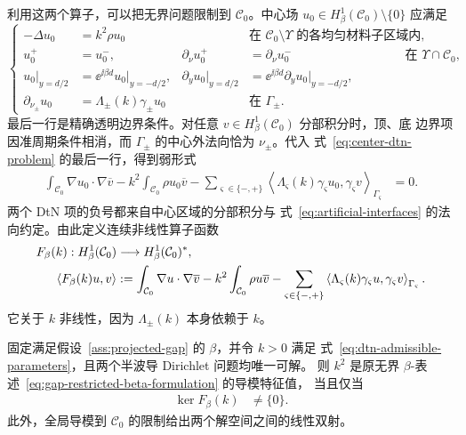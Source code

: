 利用这两个算子，可以把无界问题限制到 $\mathcal{C}_0$。中心场
$u_0\in H^1_\beta(\mathcal{C}_0)\setminus\{0\}$ 应满足
\begin{equation}
  \left\{
  \begin{aligned}
    -\Delta u_0&=k^2\rho u_0
    &&\text{在 }\mathcal{C}_0\setminus\Upsilon\text{ 的各均匀材料子区域内},\\
    u_0^+&=u_0^- ,
    &\partial_\nu u_0^+&=\partial_\nu u_0^-
    &&\text{在 }\Upsilon\cap\mathcal{C}_0,\\
    u_0|_{y=d/2}
    &=\ee^{\ii\beta d}u_0|_{y=-d/2},
    &\partial_yu_0|_{y=d/2}
    &=\ee^{\ii\beta d}\partial_yu_0|_{y=-d/2},\\
    \partial_{\nu_\pm}u_0
    &=\Lambda_\pm(k)\gamma_\pm u_0
    &&\text{在 }\Gamma_\pm.
  \end{aligned}
  \right.
  \label{eq:center-dtn-problem}
\end{equation}
最后一行是精确透明边界条件。对任意 $v\in H^1_\beta(\mathcal{C}_0)$ 分部积分时，顶、底
边界项因准周期条件相消，而 $\Gamma_\pm$ 的中心外法向恰为 $\nu_\pm$。代入
式~\eqref{eq:center-dtn-problem} 的最后一行，得到弱形式
\begin{align}
  \int_{\mathcal{C}_0}\nabla u_0\mathbin{\cdot}\nabla\overline v
  -k^2\int_{\mathcal{C}_0}\rho u_0\overline v
  -\sum_{\varsigma\in\{-,+\}}
   \left\langle
   \Lambda_\varsigma(k)\gamma_\varsigma u_0,
   \gamma_\varsigma v
   \right\rangle_{\Gamma_\varsigma}
  &=0.
  \label{eq:center-dtn-weak-form}
\end{align}
两个 DtN 项的负号都来自中心区域的分部积分与
式~\eqref{eq:artificial-interfaces} 的法向约定。由此定义连续非线性算子函数
\begin{align}
  F_\beta(k):H^1_\beta(\mathcal{C}_0)
  &\longrightarrow H^1_\beta(\mathcal{C}_0)^*,
  \notag\\
  \langle F_\beta(k)u,v\rangle
  &:=\int_{\mathcal{C}_0}\nabla u\mathbin{\cdot}\nabla\overline v
  -k^2\int_{\mathcal{C}_0}\rho u\overline v
  -\sum_{\varsigma\in\{-,+\}}
   \left\langle
   \Lambda_\varsigma(k)\gamma_\varsigma u,
   \gamma_\varsigma v
   \right\rangle_{\Gamma_\varsigma}.
  \label{eq:continuous-center-operator-function}
\end{align}
它关于 $k$ 非线性，因为 $\Lambda_\pm(k)$ 本身依赖于 $k$。

\begin{proposition}
  \label{prop:continuous-dtn-equivalence}
  固定满足假设~\ref{ass:projected-gap} 的 $\beta$，并令 $k>0$ 满足
  式~\eqref{eq:dtn-admissible-parameters}，且两个半波导 Dirichlet 问题均唯一可解。
  则 $k^2$ 是原无界 $\beta$-表述~\eqref{eq:gap-restricted-beta-formulation} 的导模特征值，
  当且仅当
  \begin{align}
    \ker F_\beta(k)&\ne\{0\}.
    \label{eq:dtn-kernel-criterion}
  \end{align}
  此外，全局导模到 $\mathcal{C}_0$ 的限制给出两个解空间之间的线性双射。
\end{proposition}

